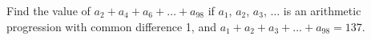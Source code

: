Find the value of $a_2 + a_4 + a_6 + \dots + a_{98}$ if $a_1$, $a_2$, $a_3$, $\dots$ is an arithmetic progression with common difference 1, and $a_1 + a_2 + a_3 + \dots + a_{98} = 137$.